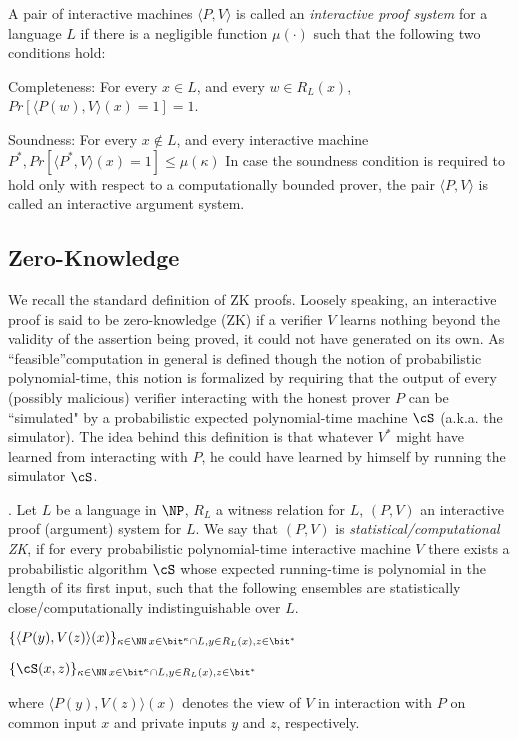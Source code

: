  A pair of interactive machines $\langle P, V \rangle$ is called an \emph{interactive proof system} for a language $L$ if there is a negligible function $\mu(\cdot)$ such that the following two conditions hold:
\BI
\item Completeness: For every $x \in L$, and every $w\in R_L(x)$, $Pr [\langle P(w), V \rangle(x)= 1] = 1$. 
\item  Soundness: For every $x \notin L$, and every interactive machine $P^*, Pr [\langle P^*, V \rangle(x) = 1] \leq\mu(\kappa)$
\EI
In case the soundness condition is required to hold only with respect to a computationally
bounded prover, the pair $\langle P, V \rangle$ is called an interactive argument system.
\ED

\subsection{Zero-Knowledge}
We recall the standard definition of ZK proofs. Loosely speaking, an interactive proof is said to be
zero-knowledge (ZK) if a verifier $V$ learns nothing beyond the validity of the assertion being proved,
it could not have generated on its own. As ``feasible''computation in general is defined though
the notion of probabilistic polynomial-time, this notion is formalized by requiring that the output
of every (possibly malicious) verifier interacting with the honest prover $P$ can be ``simulated" by
a probabilistic expected polynomial-time machine $\cS$ (a.k.a. the simulator). The idea behind this
definition is that whatever $V^*$ might have learned from interacting with $P$, he could have learned
by himself by running the simulator $\cS$. 

\BD [ZK]. Let $L$ be a language in $\NP$, $R_L$ a witness relation for $L$, $(P,V )$ an interactive
proof (argument) system for $L$. We say that $(P, V )$ is \emph{statistical/computational ZK}, if for every
probabilistic polynomial-time interactive machine $V$ there exists a probabilistic algorithm $\cS$ whose
expected running-time is polynomial in the length of its first input, such that the following ensembles
are statistically close/computationally indistinguishable over $L$.
\BI
\item $\{\langle P(y), V(z) \rangle(x)\}_{\kappa\in \NN\,x\in \bit^\kappa\cap L, y \in R_L(x), z\in\bit^*}$
\item $\{\cS (x,z)\}_{\kappa\in \NN\,x\in \bit^\kappa\cap L, y \in R_L(x), z\in\bit^*}$
\EI

where $\langle P(y), V(z) \rangle(x)$ denotes the view of $V$ in interaction with $P$ on common input $x$ and private
inputs $y$ and $z$, respectively.

